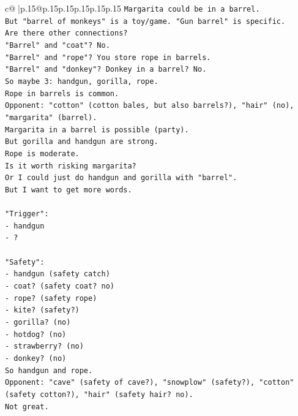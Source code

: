 \documentclass{article}
\begin{document}
{\begin{supertabular}{c@{$\;$}|p{.15\linewidth}@{}p{.15\linewidth}p{.15\linewidth}p{.15\linewidth}p{.15\linewidth}p{.15\linewidth}}
{{{\texttt{Margarita could be in a barrel.} \\
\texttt{But "barrel of monkeys" is a toy/game. "Gun barrel" is specific.} \\
\texttt{Are there other connections?} \\
\texttt{"Barrel" and "coat"? No.} \\
\texttt{"Barrel" and "rope"? You store rope in barrels.} \\
\texttt{"Barrel" and "donkey"? Donkey in a barrel? No.} \\
\texttt{So maybe 3: handgun, gorilla, rope.} \\
\texttt{Rope in barrels is common.} \\
\texttt{Opponent: "cotton" (cotton bales, but also barrels?), "hair" (no), "margarita" (barrel).} \\
\texttt{Margarita in a barrel is possible (party).} \\
\texttt{But gorilla and handgun are strong.} \\
\texttt{Rope is moderate.} \\
\texttt{Is it worth risking margarita?} \\
\texttt{Or I could just do handgun and gorilla with "barrel".} \\
\texttt{But I want to get more words.} \\
\\ 
\texttt{"Trigger":} \\
\texttt{{-} handgun} \\
\texttt{{-} ?} \\
\\ 
\texttt{"Safety":} \\
\texttt{{-} handgun (safety catch)} \\
\texttt{{-} coat? (safety coat? no)} \\
\texttt{{-} rope? (safety rope)} \\
\texttt{{-} kite? (safety?)} \\
\texttt{{-} gorilla? (no)} \\
\texttt{{-} hotdog? (no)} \\
\texttt{{-} strawberry? (no)} \\
\texttt{{-} donkey? (no)} \\
\texttt{So handgun and rope.} \\
\texttt{Opponent: "cave" (safety of cave?), "snowplow" (safety?), "cotton" (safety cotton?), "hair" (safety hair? no).} \\
\texttt{Not great.} \\
}}}
\end{supertabular}}
\end{document}
